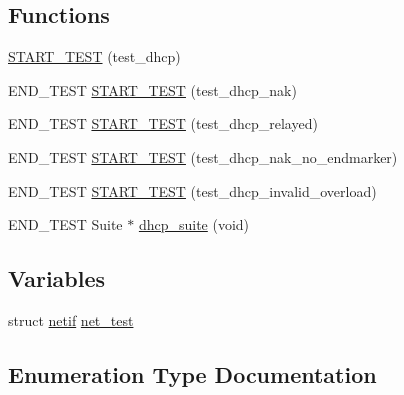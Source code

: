 \subsection*{Functions}
\begin{DoxyCompactItemize}
\item 
\hyperlink{openmote-cc2538_2lwip_2test_2unit_2dhcp_2test__dhcp_8c_a7a2a6f7b32d1c396e14be8199fedaada}{S\+T\+A\+R\+T\+\_\+\+T\+E\+ST} (test\+\_\+dhcp)
\item 
E\+N\+D\+\_\+\+T\+E\+ST \hyperlink{openmote-cc2538_2lwip_2test_2unit_2dhcp_2test__dhcp_8c_a4fd1e283fce78681e0e76a54387031ae}{S\+T\+A\+R\+T\+\_\+\+T\+E\+ST} (test\+\_\+dhcp\+\_\+nak)
\item 
E\+N\+D\+\_\+\+T\+E\+ST \hyperlink{openmote-cc2538_2lwip_2test_2unit_2dhcp_2test__dhcp_8c_aefd7327fb3c8d0fdff3614b926a359ec}{S\+T\+A\+R\+T\+\_\+\+T\+E\+ST} (test\+\_\+dhcp\+\_\+relayed)
\item 
E\+N\+D\+\_\+\+T\+E\+ST \hyperlink{openmote-cc2538_2lwip_2test_2unit_2dhcp_2test__dhcp_8c_af7d5cd09524414060c090ac253b78b33}{S\+T\+A\+R\+T\+\_\+\+T\+E\+ST} (test\+\_\+dhcp\+\_\+nak\+\_\+no\+\_\+endmarker)
\item 
E\+N\+D\+\_\+\+T\+E\+ST \hyperlink{openmote-cc2538_2lwip_2test_2unit_2dhcp_2test__dhcp_8c_a5586bb7e087c78116cb6d9cc1fc0007c}{S\+T\+A\+R\+T\+\_\+\+T\+E\+ST} (test\+\_\+dhcp\+\_\+invalid\+\_\+overload)
\item 
E\+N\+D\+\_\+\+T\+E\+ST Suite $\ast$ \hyperlink{openmote-cc2538_2lwip_2test_2unit_2dhcp_2test__dhcp_8c_a71a2282e4ff03b248c9ac117cc8ae3b5}{dhcp\+\_\+suite} (void)
\end{DoxyCompactItemize}
\subsection*{Variables}
\begin{DoxyCompactItemize}
\item 
struct \hyperlink{structnetif}{netif} \hyperlink{openmote-cc2538_2lwip_2test_2unit_2dhcp_2test__dhcp_8c_af164a2cab991b7a252402d6cd3fdc9f5}{net\+\_\+test}
\end{DoxyCompactItemize}


\subsection{Enumeration Type Documentation}
\mbox{\label{openmote-cc2538_2lwip_2test_2unit_2dhcp_2test__dhcp_8c_a1078c63ec0347d587df84e26daaebc2c}} 
